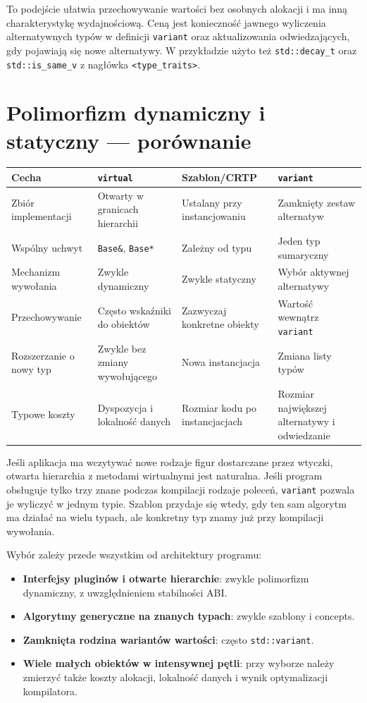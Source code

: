 \noindent To podejście ułatwia przechowywanie wartości bez osobnych
alokacji i ma inną charakterystykę wydajnościową. Ceną jest
konieczność jawnego wyliczenia alternatywnych typów w definicji
\texttt{variant} oraz aktualizowania odwiedzających, gdy pojawiają
się nowe alternatywy. W przykładzie użyto też
\texttt{std::decay\_t} oraz \texttt{std::is\_same\_v}
z nagłówka \texttt{<type\_traits>}.

\section{Polimorfizm dynamiczny i statyczny — porównanie}
\label{sec:cpp12-comparison}

\begin{center}
\small
\begin{tabularx}{\textwidth}{@{}p{}XXX@{}}
\toprule
\textbf{Cecha} & \textbf{\texttt{virtual}} & \textbf{Szablon/CRTP} & \textbf{\texttt{variant}} \\
\midrule
Zbiór implementacji & Otwarty w granicach hierarchii & Ustalany przy instancjowaniu & Zamknięty zestaw alternatyw \\
Wspólny uchwyt & \texttt{Base\&}, \texttt{Base*} & Zależny od typu & Jeden typ sumaryczny \\
Mechanizm wywołania & Zwykle dynamiczny & Zwykle statyczny & Wybór aktywnej alternatywy \\
Przechowywanie & Często wskaźniki do obiektów & Zazwyczaj konkretne obiekty & Wartość wewnątrz \texttt{variant} \\
Rozszerzanie o nowy typ & Zwykle bez zmiany wywołującego & Nowa instancjacja & Zmiana listy typów \\
Typowe koszty & Dyspozycja i lokalność danych & Rozmiar kodu po instancjacjach & Rozmiar największej alternatywy i odwiedzanie \\
\bottomrule
\end{tabularx}
\end{center}

Jeśli aplikacja ma wczytywać nowe rodzaje figur dostarczane przez
wtyczki, otwarta hierarchia z metodami wirtualnymi jest naturalna.
Jeśli program obsługuje tylko trzy znane podczas kompilacji rodzaje
poleceń, \texttt{variant} pozwala je wyliczyć w jednym typie. Szablon
przydaje się wtedy, gdy ten sam algorytm ma działać na wielu typach,
ale konkretny typ znamy już przy kompilacji wywołania.

Wybór zależy przede wszystkim od architektury programu:
\begin{itemize}
\item \textbf{Interfejsy pluginów i otwarte hierarchie}: zwykle
  polimorfizm dynamiczny, z uwzględnieniem stabilności ABI.
\item \textbf{Algorytmy generyczne na znanych typach}: zwykle
  szablony i concepts.
\item \textbf{Zamknięta rodzina wariantów wartości}: często
  \texttt{std::variant}.
\item \textbf{Wiele małych obiektów w intensywnej pętli}: przy wyborze
  należy zmierzyć także koszty alokacji, lokalność danych i wynik
  optymalizacji kompilatora.
\end{itemize}

